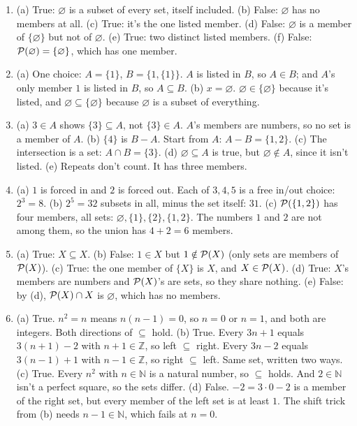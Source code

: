 \begin{enumerate}[label=\textbf{\arabic*.},leftmargin=1.8em,itemsep=0.45em]
  \item (a) True: $\varnothing$ is a subset of every set, itself included. (b) False: $\varnothing$ has no members at all. (c) True: it's the one listed member. (d) False: $\varnothing$ is a member of $\{\varnothing\}$ but not of $\varnothing$. (e) True: two distinct listed members. (f) False: $\mathcal{P}(\varnothing)=\{\varnothing\}$, which has one member.
  \item (a) One choice: $A=\{1\}$, $B=\{1,\{1\}\}$. $A$ is listed in $B$, so $A\in B$; and $A$'s only member $1$ is listed in $B$, so $A\subseteq B$. (b) $x=\varnothing$. $\varnothing\in\{\varnothing\}$ because it's listed, and $\varnothing\subseteq\{\varnothing\}$ because $\varnothing$ is a subset of everything.
  \item (a) $3\in A$ shows $\{3\}\subseteq A$, not $\{3\}\in A$. $A$'s members are numbers, so no set is a member of $A$.
  (b) $\{4\}$ is $B-A$. Start from $A$: $A-B=\{1,2\}$.
  (c) The intersection is a set: $A\cap B=\{3\}$.
  (d) $\varnothing\subseteq A$ is true, but $\varnothing\notin A$, since it isn't listed.
  (e) Repeats don't count. It has three members.
  \item (a) $1$ is forced in and $2$ is forced out. Each of $3,4,5$ is a free in/out choice: $2^3=8$.
  (b) $2^5=32$ subsets in all, minus the set itself: $31$.
  (c) $\mathcal{P}(\{1,2\})$ has four members, all sets: $\varnothing,\{1\},\{2\},\{1,2\}$. The numbers $1$ and $2$ are not among them, so the union has $4+2=6$ members.
  \item (a) True: $X\subseteq X$. (b) False: $1\in X$ but $1\notin\mathcal{P}(X)$ (only sets are members of $\mathcal{P}(X)$). (c) True: the one member of $\{X\}$ is $X$, and $X\in\mathcal{P}(X)$. (d) True: $X$'s members are numbers and $\mathcal{P}(X)$'s are sets, so they share nothing. (e) False: by (d), $\mathcal{P}(X)\cap X$ is $\varnothing$, which has no members.
  \item (a) True. $n^2=n$ means $n(n-1)=0$, so $n=0$ or $n=1$, and both are integers. Both directions of $\subseteq$ hold.
  (b) True. Every $3n+1$ equals $3(n+1)-2$ with $n+1\in\mathbb{Z}$, so left $\subseteq$ right. Every $3n-2$ equals $3(n-1)+1$ with $n-1\in\mathbb{Z}$, so right $\subseteq$ left. Same set, written two ways.
  (c) True. Every $n^2$ with $n\in\mathbb{N}$ is a natural number, so $\subseteq$ holds. And $2\in\mathbb{N}$ isn't a perfect square, so the sets differ.
  (d) False. $-2=3\cdot0-2$ is a member of the right set, but every member of the left set is at least $1$. The shift trick from (b) needs $n-1\in\mathbb{N}$, which fails at $n=0$.
\end{enumerate}
